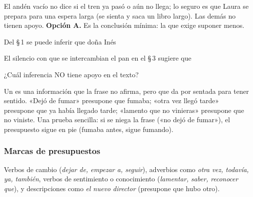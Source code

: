 \begin{retoresuelto}
El andén vacío no dice si el tren ya pasó o aún no llega; lo seguro es que Laura se prepara para una espera larga (se
sienta y saca un libro largo). Las demás no tienen apoyo. \textbf{Opción A.} Es la conclusión mínima: la que exige
suponer menos.
\end{retoresuelto}

\taller
{}
\begin{ejercicios}
\item Del \S\,1 se puede inferir que doña Inés
\item El silencio con que se intercambian el pan en el \S\,3 sugiere que
\item ¿Cuál inferencia NO tiene apoyo en el texto?
\end{ejercicios}

\bitacora


Un  es una información que la frase no afirma, pero que da por sentada para tener sentido. «Dejó de
fumar» presupone que fumaba; «otra vez llegó tarde» presupone que ya había llegado tarde; «lamento que no vinieras»
presupone que no viniste. Una prueba sencilla: si se niega la frase («no dejó de fumar»), el presupuesto sigue en pie
(fumaba antes, sigue fumando).

\subsubsection{Marcas de presupuestos}
Verbos de cambio (\emph{dejar de, empezar a, seguir}), adverbios como \emph{otra vez, todavía, ya, también}, verbos de
sentimiento o conocimiento (\emph{lamentar, saber, reconocer que}), y descripciones como \emph{el nuevo director}
(presupone que hubo otro).


